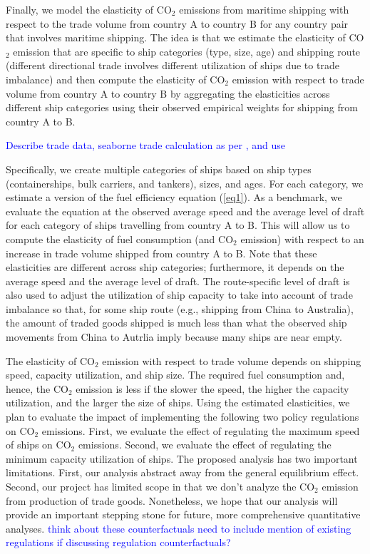 \documentclass[hidelinks, 12pt,letterpaper]{article}
\begin{document}
Finally, we model the elasticity of CO$_2$ emissions from maritime shipping with respect to the trade volume from country A to country B for any country pair that involves maritime shipping. The idea is that we estimate  the elasticity of CO$_2$ emission that are specific to ship categories (type, size, age) and shipping route (different directional trade involves different utilization of ships due to trade imbalance) and then compute the elasticity of CO$_2$ emission  with respect to trade volume from country A to country B by aggregating the elasticities across different ship categories using their observed empirical weights for shipping from country A to B.

\textcolor{blue}{Describe trade data, seaborne trade calculation as per \citet{wang2021trade}, and use}

Specifically, we create multiple categories of ships based on ship types (containerships, bulk carriers, and tankers), sizes, and ages. For each category, we estimate a version of the fuel efficiency equation (\ref{eq1}). As a benchmark, we evaluate the equation at the observed average speed and the average level of draft for each category of ships travelling from country A to B. This will allow us to compute the elasticity of fuel consumption (and CO$_2$ emission) with respect to an increase in trade volume shipped from country A to  B.  Note that these elasticities are different across ship categories; furthermore, it depends on the average speed and the average level of draft. The route-specific level of draft is also used to adjust the utilization of ship capacity to take into account of trade imbalance so that, for some ship route (e.g., shipping from China to Australia), the amount of traded goods shipped is much less than what the observed ship movements from China to Autrlia imply because many ships are near empty. 

The elasticity of  CO$_2$ emission with respect to trade volume depends on shipping speed, capacity utilization, and ship size. The required  fuel consumption and, hence, the CO$_2$ emission is less if the slower the speed, the higher the capacity utilization, and the larger the size of ships.  Using the estimated elasticities, we plan to evaluate the impact of implementing  the following two policy regulations on CO$_2$ emissions. First, we evaluate the effect of regulating the maximum speed of ships on CO$_2$ emissions. Second, we evaluate the effect of regulating the minimum capacity utilization of ships. The proposed analysis has two important limitations. First,  our analysis abstract away from the general equilibrium effect. Second, our project has limited scope in that we don't analyze the CO$_2$ emission from production of trade goods. Nonetheless, we hope that our analysis will provide an important stepping stone for future, more comprehensive quantitative analyses. 
\textcolor{blue}{think about these counterfactuals}
\textcolor{blue}{need to include mention of existing regulations if discussing regulation counterfactuals?}
\end{document}
